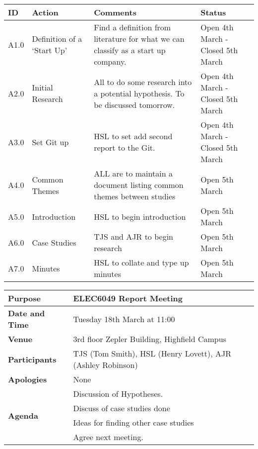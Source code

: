 \begin{center}
\begin{longtable}{| p{} | >{\raggedright\arraybackslash}p{} |  p{} | >{\raggedright\arraybackslash}p{}|} \hline
\textbf{ID} & \textbf{Action} & \textbf{Comments} & \textbf{Status} \\ \hline
\endhead
A1.0	&	Definition of a `Start Up'	&	Find a definition from literature for what we can classify as a start up company.	& Open 4th March - Closed 5th March \\ \hline
A2.0	&	Initial Research	&	All to do some research into a potential hypothesis. To be discussed tomorrow.	&	Open 4th March - Closed 5th March\\ \hline
A3.0	&	Set Git up	&	HSL to set add second report to the Git.	&	Open 4th March	- Closed 5th March\\ \hline	
A4.0	&	Common Themes	&	ALL are to maintain a document listing common themes between studies & Open 5th March \\ \hline
A5.0	&	Introduction	&	HSL to begin introduction	&	Open 5th March \\ \hline
A6.0	&	Case Studies	&	TJS and AJR to begin research & Open 5th March \\ \hline
A7.0	&	Minutes		& 	HSL to collate and type up minutes & Open 5th March \\ \hline
\end{longtable}
\end{center}




{}
\begin{center}
\begin{longtable}{| m{} | m{} |} \hline
\textbf{Purpose} & ELEC6049 Report Meeting \\ \hline
\textbf{Date and Time} & Tuesday 18th March at 11:00 \\ \hline
\textbf{Venue} & 3rd floor Zepler Building, Highfield Campus \\ \hline
\textbf{Participants} & TJS (Tom Smith), HSL (Henry Lovett), AJR (Ashley Robinson)\\ \hline
\textbf{Apologies} & None \\ \hline
\multirow{5}{*}{\textbf{Agenda}} & Discussion of Hypotheses. \\
 & Discuss of case studies done \\ 
 & Ideas for finding other case studies \\ 
 & Agree next meeting. \\ \hline
\end{longtable}
\end{center}

